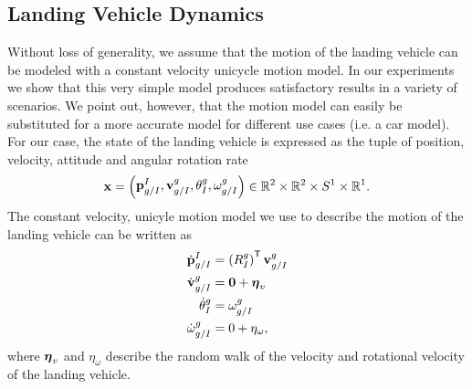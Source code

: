 
\subsection{Landing Vehicle Dynamics}
Without loss of generality, we assume that the motion of the landing vehicle can be modeled with a constant
velocity unicycle motion model. In our experiments we show that this very simple
model produces satisfactory results in a variety of scenarios. We point out,
however, that the motion model can easily be substituted for a more accurate
model for different use cases (i.e. a car model). For our case, the state of the landing vehicle is expressed as the tuple of
position, velocity, attitude and angular rotation rate
\begin{equation*}
  \boldsymbol{\mathrm{x}} =
    \begin{pmatrix}
      \boldsymbol{\mathrm{p}}_{g/I}^{I}, \boldsymbol{\mathrm{v}}_{g/I}^{g}, \theta_{I}^{g},
      \omega_{g/I}^{g}
    \end{pmatrix}
    \in
    \mathbb{R}^2 \times \mathbb{R}^2 \times S^1 \times \mathbb{R}^1.
\end{equation*}
The constant velocity, unicyle motion model we use to describe the motion of the
landing vehicle can be written as
\begin{align}
  \dot{\boldsymbol{\mathrm{p}}}_{g/I}^I
  &=
  \left( R_I^g \right)^{\mathsf{T}} \boldsymbol{\mathrm{v}}_{g/I}^g  \\
  \dot{\boldsymbol{\mathrm{v}}}_{g/I}^g
  &=
  \boldsymbol{\mathrm{0}} + \boldsymbol{\mathrm{\eta}}_v \\
  \dot{\theta}_{I}^g
  &=
  \omega_{g/I}^g \\
  \dot{\omega}_{g/I}^g
  &=
  0 +\eta_\omega,
\end{align}
where $\boldsymbol{\mathrm{\eta}}_v$ and $\eta_\omega$ describe the random walk of the velocity
and rotational velocity of the landing vehicle.

